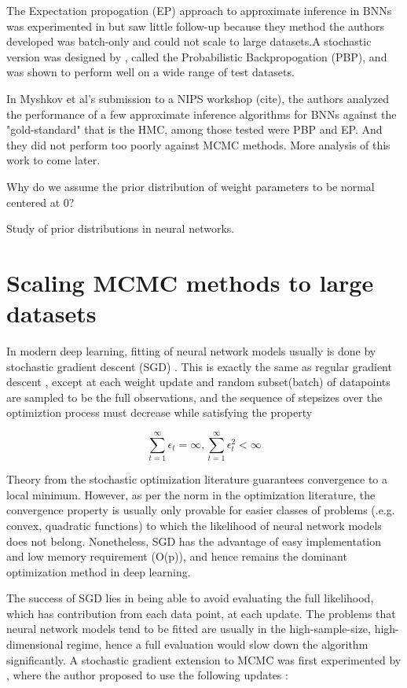 \documentclass{book}
\begin{document}
\begin{enumerate}
The Expectation propogation (EP) approach to approximate inference in BNNs was experimented in \cite{jylanki2014expectation} but saw little follow-up because they method the authors developed was batch-only and could not scale to large datasets.A stochastic version was designed by \cite{hernandez2015probabilistic}, called the Probabilistic Backpropogation (PBP), and was shown to perform well on a wide range of test datasets.

In Myshkov et al's submission to a NIPS workshop (cite), the authors analyzed the performance of a few approximate inference algorithms for BNNs against the "gold-standard" that is the HMC, among those tested were PBP and EP. And they did not perform too poorly against MCMC methods. More analysis of this work to come later.  

Why do we assume the prior distribution of weight parameters to be normal centered at 0?

Study of prior distributions in neural networks.\cite{lampinen2001bayesian,titterington2004bayesian}

\section{Scaling MCMC methods to large datasets}

In modern deep learning, fitting of neural network models usually is done by stochastic gradient descent (SGD) \cite{ngiam2011optimization}.
This is exactly the same as regular gradient descent \cite{wright1999numerical}, except at each weight update and random subset(batch) of datapoints are sampled to be the full observations, and the sequence of stepsizes over the optimiztion process must decrease while satisfying the property

\[ \sum_{t=1}^\infty \epsilon_t = \infty , \sum_{t=1}^\infty \epsilon_t^2 < \infty \]

Theory from the stochastic optimization literature \cite{robbins1951stochastic} guarantees convergence to a local minimum. However, as per the norm in the optimization literature, the convergence property is usually only provable for easier classes of problems (.e.g. convex, quadratic functions) to which the likelihood of neural network models does not belong. Nonetheless, SGD has the advantage of easy implementation and low memory requirement (O(p)), and hence remains the dominant optimization method in deep learning.  

The success of SGD lies in being able to avoid evaluating the full likelihood, which has contribution from each data point, at each update. The problems that neural network models tend to be fitted are usually in the high-sample-size, high-dimensional regime, hence a full evaluation would slow down the algorithm significantly. A stochastic gradient extension to MCMC was first experimented by \cite{welling2011bayesian}, where the author proposed to use the following updates :


\end{enumerate}
\end{document}
